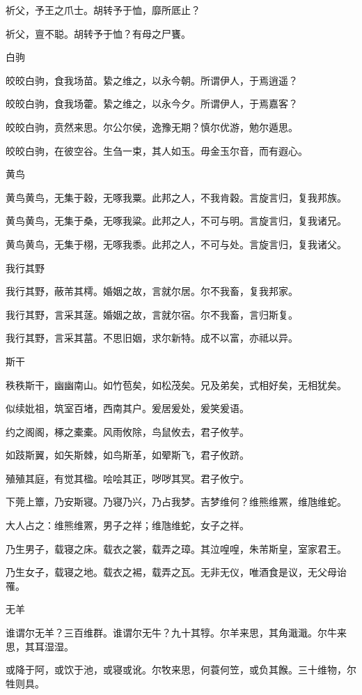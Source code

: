祈父，予王之爪士。胡转予于恤，靡所厎止？

祈父，亶不聪。胡转予于恤？有母之尸饔。

白驹

皎皎白驹，食我场苗。絷之维之，以永今朝。所谓伊人，于焉逍遥？

皎皎白驹，食我场藿。絷之维之，以永今夕。所谓伊人，于焉嘉客？

皎皎白驹，贲然来思。尔公尔侯，逸豫无期？慎尔优游，勉尔遁思。

皎皎白驹，在彼空谷。生刍一束，其人如玉。毋金玉尔音，而有遐心。

黄鸟

黄鸟黄鸟，无集于穀，无啄我粟。此邦之人，不我肯穀。言旋言归，复我邦族。

黄鸟黄鸟，无集于桑，无啄我粱。此邦之人，不可与明。言旋言归，复我诸兄。

黄鸟黄鸟，无集于栩，无啄我黍。此邦之人，不可与处。言旋言归，复我诸父。

我行其野

我行其野，蔽芾其樗。婚姻之故，言就尔居。尔不我畜，复我邦家。

我行其野，言采其蓫。婚姻之故，言就尔宿。尔不我畜，言归斯复。

我行其野，言采其葍。不思旧姻，求尔新特。成不以富，亦祗以异。

斯干

秩秩斯干，幽幽南山。如竹苞矣，如松茂矣。兄及弟矣，式相好矣，无相犹矣。

似续妣祖，筑室百堵，西南其户。爰居爰处，爰笑爰语。

约之阁阁，椓之橐橐。风雨攸除，鸟鼠攸去，君子攸芋。

如跂斯翼，如矢斯棘，如鸟斯革，如翚斯飞，君子攸跻。

殖殖其庭，有觉其楹。哙哙其正，哕哕其冥。君子攸宁。

下莞上簟，乃安斯寝。乃寝乃兴，乃占我梦。吉梦维何？维熊维罴，维虺维蛇。

大人占之：维熊维罴，男子之祥；维虺维蛇，女子之祥。

乃生男子，载寝之床。载衣之裳，载弄之璋。其泣喤喤，朱芾斯皇，室家君王。

乃生女子，载寝之地。载衣之裼，载弄之瓦。无非无仪，唯酒食是议，无父母诒罹。

无羊

谁谓尔无羊？三百维群。谁谓尔无牛？九十其犉。尔羊来思，其角濈濈。尔牛来思，其耳湿湿。

或降于阿，或饮于池，或寝或讹。尔牧来思，何蓑何笠，或负其餱。三十维物，尔牲则具。

